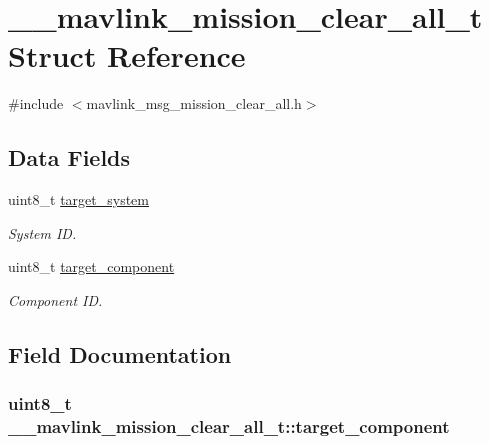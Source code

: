 \hypertarget{struct____mavlink__mission__clear__all__t}{\section{\+\_\+\+\_\+mavlink\+\_\+mission\+\_\+clear\+\_\+all\+\_\+t Struct Reference}
\label{struct____mavlink__mission__clear__all__t}
}


{\ttfamily \#include $<$mavlink\+\_\+msg\+\_\+mission\+\_\+clear\+\_\+all.\+h$>$}

\subsection*{Data Fields}
\begin{DoxyCompactItemize}
\item 
uint8\+\_\+t \hyperlink{struct____mavlink__mission__clear__all__t_ad628d39e2e099c3c1c015b15b7d4d150}{target\+\_\+system}
\begin{DoxyCompactList}\small\item\em System I\+D. \end{DoxyCompactList}\item 
uint8\+\_\+t \hyperlink{struct____mavlink__mission__clear__all__t_ac3e8927334773420a64fcd60202651f1}{target\+\_\+component}
\begin{DoxyCompactList}\small\item\em Component I\+D. \end{DoxyCompactList}\end{DoxyCompactItemize}


\subsection{Field Documentation}
\hypertarget{struct____mavlink__mission__clear__all__t_ac3e8927334773420a64fcd60202651f1}{
\subsubsection[{target\+\_\+component}]{\setlength{\rightskip}{0pt plus 5cm}uint8\+\_\+t \+\_\+\+\_\+mavlink\+\_\+mission\+\_\+clear\+\_\+all\+\_\+t\+::target\+\_\+component}}\label{struct____mavlink__mission__clear__all__t_ac3e8927334773420a64fcd60202651f1}


